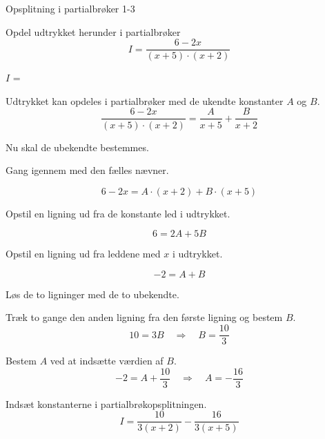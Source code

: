 \documentclass{article}
\begin{document}
\begin{exercise}{Opsplitning i partialbrøker 1-3}
	
	Opdel udtrykket herunder i partialbrøker
	\[
	I = \frac{6 - 2x}{(x + 5) \cdot (x + 2)}
	\]
	
	$I$ =  
	
	\hint
	Udtrykket kan opdeles i partialbrøker med de ukendte konstanter $A$ og $B$.
	\[
	\frac{6 - 2x}{(x + 5) \cdot (x + 2)} = 
	\frac{A}{x + 5} + \frac{B}{x + 2}
	\]
	
	\hint
	Nu skal de ubekendte bestemmes.
	
	\hint
	Gang igennem med den fælles nævner.
	
	\hint
	\[
	6 - 2x = A \cdot (x + 2) + B \cdot (x + 5)
	\]
	
	\hint
	Opstil en ligning ud fra de konstante led i udtrykket.
	
	\hint
	\[
	6 = 2A +  5B
	\]
	
	\hint
	Opstil en ligning ud fra leddene med $x$ i udtrykket.
	
	\hint
	\[
	-2 = A + B
	\]
	
	\hint
	Løs de to ligninger med de to ubekendte.
	
	\hint
	Træk to gange den anden ligning fra den første ligning og bestem $B$. 
	\[
	10 = 3B \quad	\Rightarrow		\quad		B = \frac{10}{3}
	\]
	
	\hint
	Bestem $A$ ved at indsætte værdien af $B$.
	\[
	-2 =  A + \frac{10}{3} \quad 	\Rightarrow		\quad A = -\frac{16}{3}
	\]
	
	\hint
	Indsæt konstanterne i partialbrøkopsplitningen.
	\[
	I = \frac{10}{3(x+2)} - \frac{16}{3(x+5)}
	\]
	
	
	
\end{exercise}
\end{document}
